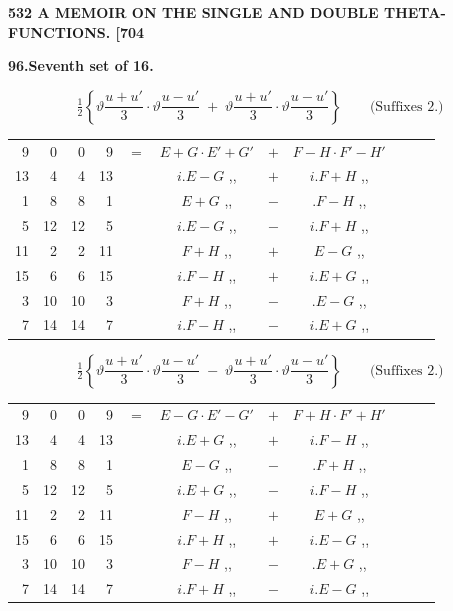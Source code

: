 \documentclass[11pt]{article}
\newcommand{\half}{\tfrac{1}{2}}
\begin{document}
\newpage
\noindent\textbf{532 \hfill A MEMOIR ON THE SINGLE AND DOUBLE THETA-FUNCTIONS. \hfill [704}

\medskip
\begin{center}\textbf{96.\quad Seventh set of 16.}\end{center}

\[
\half\!\left\{\vartheta\frac{u+u'}{3}\cdot\vartheta\frac{u-u'}{3}\;+\;\vartheta\frac{u+u'}{3}\cdot\vartheta\frac{u-u'}{3}\right\}\qquad\text{(Suffixes 2.)}
\]
{\small
\begin{center}
\begin{tabular}{rrrrr@{\ }c@{\ }lcr@{\ }c@{\ }l}
9  & 0  & 0  & 9  & $=$ & $E+G\cdot E'+G'$ & $+$ & $F-H\cdot F'-H'$ \\
13 & 4  & 4  & 13 & & $i.E-G$ \quad ,, & $+$ & $i.F+H$ \quad ,, \\
1  & 8  & 8  & 1  & & $E+G$ \quad ,, & $-$ & $.F-H$ \quad ,, \\
5  & 12 & 12 & 5  & & $i.E-G$ \quad ,, & $-$ & $i.F+H$ \quad ,, \\
11 & 2  & 2  & 11 & & $F+H$ \quad ,, & $+$ & $E-G$ \quad ,, \\
15 & 6  & 6  & 15 & & $i.F-H$ \quad ,, & $+$ & $i.E+G$ \quad ,, \\
3  & 10 & 10 & 3  & & $F+H$ \quad ,, & $-$ & $.E-G$ \quad ,, \\
7  & 14 & 14 & 7  & & $i.F-H$ \quad ,, & $-$ & $i.E+G$ \quad ,, \\
\end{tabular}
\end{center}
}

\[
\half\!\left\{\vartheta\frac{u+u'}{3}\cdot\vartheta\frac{u-u'}{3}\;-\;\vartheta\frac{u+u'}{3}\cdot\vartheta\frac{u-u'}{3}\right\}\qquad\text{(Suffixes 2.)}
\]
{\small
\begin{center}
\begin{tabular}{rrrrr@{\ }c@{\ }lcr@{\ }c@{\ }l}
9  & 0  & 0  & 9  & $=$ & $E-G\cdot E'-G'$ & $+$ & $F+H\cdot F'+H'$ \\
13 & 4  & 4  & 13 & & $i.E+G$ \quad ,, & $+$ & $i.F-H$ \quad ,, \\
1  & 8  & 8  & 1  & & $E-G$ \quad ,, & $-$ & $.F+H$ \quad ,, \\
5  & 12 & 12 & 5  & & $i.E+G$ \quad ,, & $-$ & $i.F-H$ \quad ,, \\
11 & 2  & 2  & 11 & & $F-H$ \quad ,, & $+$ & $E+G$ \quad ,, \\
15 & 6  & 6  & 15 & & $i.F+H$ \quad ,, & $+$ & $i.E-G$ \quad ,, \\
3  & 10 & 10 & 3  & & $F-H$ \quad ,, & $-$ & $.E+G$ \quad ,, \\
7  & 14 & 14 & 7  & & $i.F+H$ \quad ,, & $-$ & $i.E-G$ \quad ,, \\
\end{tabular}
\end{center}
}
\end{document}
